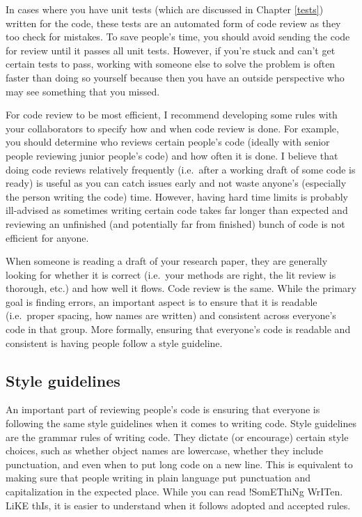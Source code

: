 \documentclass[
]{krantz}
\begin{document}
In cases where you have unit tests (which are discussed in
Chapter \ref{tests}) written for the code, these tests are
an automated form of code review as they too check for
mistakes. To save people's time, you should avoid sending
the code for review until it passes all unit tests. However,
if you're stuck and can't get certain tests to pass, working
with someone else to solve the problem is often faster than
doing so yourself because then you have an outside
perspective who may see something that you missed.

For code review to be most efficient, I recommend developing
some rules with your collaborators to specify how and when
code review is done. For example, you should determine who
reviews certain people's code (ideally with senior people
reviewing junior people's code) and how often it is done. I
believe that doing code reviews relatively frequently
(i.e.~after a working draft of some code is ready) is useful
as you can catch issues early and not waste anyone's
(especially the person writing the code) time. However,
having hard time limits is probably ill-advised as sometimes
writing certain code takes far longer than expected and
reviewing an unfinished (and potentially far from finished)
bunch of code is not efficient for anyone.

When someone is reading a draft of your research paper, they
are generally looking for whether it is correct (i.e.~your
methods are right, the lit review is thorough, etc.) and how
well it flows. Code review is the same. While the primary
goal is finding errors, an important aspect is to ensure
that it is readable (i.e.~proper spacing, how names are
written) and consistent across everyone's code in that
group. More formally, ensuring that everyone's code is
readable and consistent is having people follow a style
guideline.

\hypertarget{style-guidelines}{%
\subsection{Style guidelines}\label{style-guidelines}}

An important part of reviewing people's code is ensuring
that everyone is following the same style guidelines when it
comes to writing code. Style guidelines are the grammar
rules of writing code. They dictate (or encourage) certain
style choices, such as whether object names are lowercase,
whether they include punctuation, and even when to put long
code on a new line. This is equivalent to making sure that
people writing in plain language put punctuation and
capitalization in the expected place. While you can read
!SomEThiNg WrITen. LiKE thIs, it is easier to understand
when it follows adopted and accepted rules.
\end{document}
